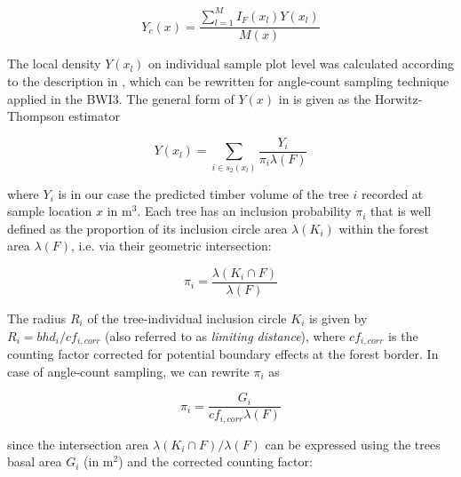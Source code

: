 \begin{equation}\label{eq:locdens_clust}
Y_{c}(x) = \frac{\sum_{l=1}^{M} I_{F}(x_{l}) Y(x_l)}{M(x)}
\end{equation}

The local density $Y(x_l)$ on individual sample plot level was calculated according to the description in \citet{mandallaz2008}, which can be rewritten for angle-count sampling technique applied in the BWI3. The general form of $Y(x)$ in \citet{mandallaz2008} is given as the Horwitz-Thompson estimator 

\begin{equation}\label{eq:locdens_plot}
Y(x_l)=\sum_{i \in s_{2}(x_l)}\frac{Y_i}{\pi_{i}\lambda(F)}
\end{equation}

where $Y_i$ is in our case the predicted timber volume of the tree $i$ recorded at sample location $x$ in m$^3$. Each tree has an inclusion probability $\pi_{i}$ that is well defined as the proportion of its inclusion circle area $\lambda(K_i)$ within the forest area $\lambda(F)$, i.e. via their geometric intersection:

%

\begin{equation}\label{locdens_plot_1}
\pi_{i} = \frac{\lambda(K_i \cap F)}{\lambda(F)}
\end{equation}

The radius $R_i$ of the tree-individual inclusion circle $K_i$ is given by $R_i = bhd_{i}/cf_{i,corr}$ (also referred to as \textit{limiting distance}), where $cf_{i,corr}$ is the counting factor corrected for potential boundary effects at the forest border. In case of angle-count sampling, we can rewrite $\pi_{i}$ as

\begin{equation}\label{eq:locdens_plot_2}
\pi_{i} = \frac{G_i}{cf_{i,corr}\lambda(F)}
\end{equation}

since the intersection area $\lambda(K_i \cap F)/\lambda(F)$ can be expressed using the trees basal area $G_i$ (in m$^2$) and the corrected counting factor:

